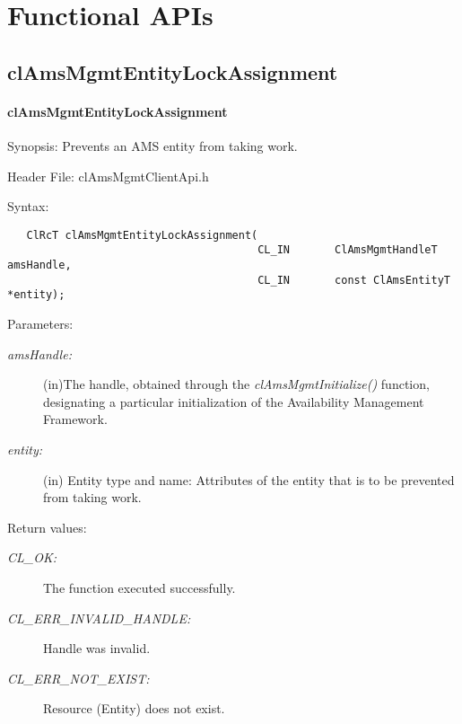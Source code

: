 \newpage
\section{Functional APIs}
\subsection{clAmsMgmtEntityLockAssignment}
\hypertarget{pageams110}{}\paragraph{cl\-Ams\-Mgmt\-Entity\-Lock\-Assignment}\label{pageams110}
\begin{Desc}
\item[Synopsis:]Prevents an AMS entity from taking work.\end{Desc}
\begin{Desc}
\item[Header File:]clAmsMgmtClientApi.h\end{Desc}
\begin{Desc}
\item[Syntax:]

\footnotesize\begin{verbatim}   ClRcT clAmsMgmtEntityLockAssignment(
        		                       CL_IN       ClAmsMgmtHandleT            amsHandle,
		                               CL_IN       const ClAmsEntityT          *entity);
\end{verbatim}
\normalsize
\end{Desc}
\begin{Desc}
\item[Parameters:]
\begin{description}
\item[{\em ams\-Handle:}](in)The handle, obtained through the \textit{clAmsMgmtInitialize()} function, designating a particular initialization 
of the Availability Management Framework. \item[{\em entity:}](in) Entity type and name: Attributes of the entity that is to be prevented from 
taking work.\end{description}
\end{Desc}
\begin{Desc}
\item[Return values:]
\begin{description}
\item[{\em CL\_\-OK:}]The function executed successfully. \item[{\em CL\_\-ERR\_\-INVALID\_\-HANDLE:}]Handle was invalid. \item[{\em CL\_\-ERR\_\-NOT\_\-EXIST:}]Resource (Entity) does not exist.\end{description}
\end{Desc}
